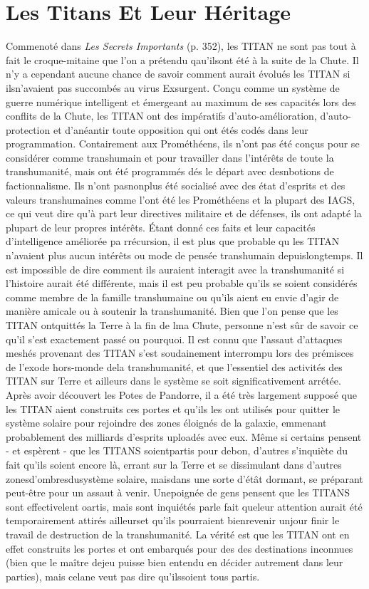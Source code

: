 \section{Les Titans Et Leur Héritage} 

Commenoté dans \textit{Les Secrets Importants} (p. 352), les TITAN ne sont pas tout à fait le croque-mitaine que l'on a prétendu qau'ilsont été à la suite de la Chute. Il n'y a cependant aucune chance de savoir comment aurait évolués les TITAN si ilsn'avaient pas succombés au virus Exsurgent. Conçu comme un système de guerre numérique intelligent et émergeant au maximum de ses capacités lors des conflits de la Chute, les TITAN ont des impératifs d'auto-amélioration, d'auto-protection et d'anéantir toute opposition qui ont étés codés dans leur programmation. Contairement aux Prométhéens, ils n'ont pas été conçus pour se considérer comme transhumain et pour travailler dans l'intérêts de toute la transhumanité, mais ont été programmés dés le départ avec desnbotions de factionnalisme. Ils n'ont pasnonplus été socialisé avec des état d'esprits et des valeurs transhumaines comme l'ont été les Prométhéens et la  plupart des IAGS, ce qui veut dire qu'à part leur directives militaire et de défenses, ils ont adapté la plupart de leur propres intérêts. Étant donné ces faits et leur capacités d'intelligence améliorée pa rrécursion, il est plus que probable qu les TITAN n'avaient plus aucun intérêts ou mode de pensée transhumain depuislongtemps. Il est impossible de dire comment ils auraient interagit avec la transhumanité si l'histoire aurait été différente, mais il est peu probable qu'ils se soient considérés comme membre de la famille transhumaine ou qu'ils aient eu envie d'agir de manière amicale ou à soutenir la transhumanité. Bien que l'on pense que les TITAN ontquittés la Terre à la fin de lma Chute, personne n'est sûr de savoir ce qu'il s'est exactement passé ou pourquoi. Il est connu que l'assaut d'attaques meshés provenant des TITAN s'est soudainement interrompu lors des prémisces de l'exode hors-monde dela transhumanité, et que l'essentiel des activités des TITAN sur Terre et ailleurs dans le système se soit significativement arrétée. Après avoir découvert les Potes de Pandorre, il a été très largement supposé que les TITAN aient construits ces portes et qu'ils les ont utilisés pour quitter le système solaire pour rejoindre des zones éloignés de la galaxie, emmenant probablement des milliards d'esprits uploadés avec eux. Même si certains pensent - et espèrent - que les TITANS soientpartis pour debon, d'autres s'inquiète du fait qu'ils soient encore là, errant sur la Terre et se dissimulant dans d'autres zonesd'ombresdusystème solaire, maisdans une sorte d'étât dormant, se préparant peut-être pour un assaut à venir. Unepoignée de gens pensent que les TITANS sont effectivelent oartis, mais sont inquiétés parle fait queleur attention aurait été temporairement attirés ailleurset qu'ils pourraient bienrevenir unjour finir le travail de destruction de la transhumanité. La vérité est que les TITAN ont en effet construits les portes et ont embarqués pour des des destinations inconnues (bien que le maître dejeu puisse bien entendu en  décider autrement dans leur parties), mais celane veut pas dire qu'ilssoient tous partis. 